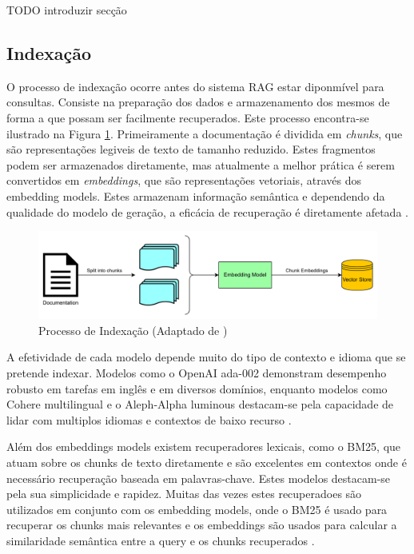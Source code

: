 TODO introduzir secção

\subsection{Indexação}

O processo de indexação ocorre antes do sistema RAG estar diponmível para consultas. Consiste na preparação dos dados e armazenamento dos mesmos de forma a que possam ser facilmente recuperados. Este processo encontra-se ilustrado na Figura \ref{fig:acrh-rag}. Primeiramente a documentação é dividida em \textit{chunks}, que são representações legiveis de texto de tamanho reduzido. Estes fragmentos podem ser armazenados diretamente, mas atualmente a melhor prática é serem convertidos em \textit{embeddings}, que são representações vetoriais, através dos embedding models. Estes armazenam informação semântica e dependendo da qualidade do modelo de geração, a eficácia de recuperação é diretamente afetada \parencite{rau2024context, vspeleticexploring}.


\begin{figure}[H]
        \centering
        \includegraphics[width=1\linewidth]{ch3/assets/arquitetura-embedding.png}
        \caption{Processo de Indexação (Adaptado de \cite{vspeleticexploring})}
        \label{fig:acrh-rag}
\end{figure}


A efetividade de cada modelo depende muito do tipo de contexto e idioma que se pretende indexar. Modelos como o OpenAI ada-002 demonstram desempenho robusto em tarefas em inglês e em diversos domínios, enquanto modelos como Cohere multilingual e o Aleph-Alpha luminous destacam-se pela capacidade de lidar com multiplos idiomas e contextos de baixo recurso \parencite{kamalloo2023evaluating}. 

Além dos embeddings models existem recuperadores lexicais, como o BM25, que atuam sobre os chunks de texto diretamente e são excelentes em contextos onde é necessário recuperação baseada em palavras-chave. Estes modelos destacam-se pela sua simplicidade e rapidez. Muitas das vezes estes recuperadoes são utilizados em conjunto com os embedding models, onde o BM25 é usado para recuperar os chunks mais relevantes e os embeddings são usados para calcular a similaridade semântica entre a query e os chunks recuperados \parencite{gupta2024comprehensive, kamalloo2023evaluating}.


